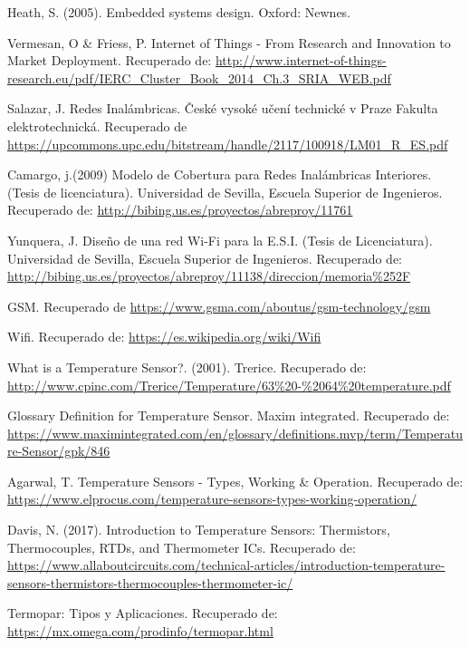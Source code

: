 \begin{thebibliography}{0}
	 Heath, S. (2005). Embedded systems design. Oxford: Newnes.
	
	 Vermesan, O \& Friess, P. Internet of Things - From Research and Innovation to Market Deployment. Recuperado de:  \url{http://www.internet-of-things-research.eu/pdf/IERC_Cluster_Book_2014_Ch.3_SRIA_WEB.pdf}
	
	 Salazar, J. Redes Inalámbricas. České vysoké učení technické v Praze Fakulta elektrotechnická. Recuperado de \url{https://upcommons.upc.edu/bitstream/handle/2117/100918/LM01_R_ES.pdf}
	
	 Camargo, j.(2009) Modelo de Cobertura para Redes Inalámbricas Interiores. (Tesis de licenciatura). Universidad de Sevilla, Escuela Superior de Ingenieros. Recuperado de: \url{http://bibing.us.es/proyectos/abreproy/11761}
	
	 Yunquera, J. Diseño de una red Wi-Fi para la E.S.I. (Tesis de Licenciatura). Universidad de Sevilla, Escuela Superior de Ingenieros. Recuperado de: \url{http://bibing.us.es/proyectos/abreproy/11138/direccion/memoria%252F}
	
	 GSM. Recuperado de \url{https://www.gsma.com/aboutus/gsm-technology/gsm}
	
	 Wifi. Recuperado de: \url{https://es.wikipedia.org/wiki/Wifi}
	
	
	 What is a Temperature Sensor?. (2001). Trerice. Recuperado de: \url{http://www.cpinc.com/Trerice/Temperature/63%20-%2064%20temperature.pdf}
	
	 Glossary Definition for Temperature Sensor. Maxim integrated. Recuperado de: \url{https://www.maximintegrated.com/en/glossary/definitions.mvp/term/Temperature-Sensor/gpk/846}
	
	 Agarwal, T.  Temperature Sensors - Types, Working \& Operation. Recuperado de: \url{https://www.elprocus.com/temperature-sensors-types-working-operation/}
	
	 Davis, N. (2017). Introduction to Temperature Sensors: Thermistors, Thermocouples, RTDs, and Thermometer ICs. Recuperado de: \url{https://www.allaboutcircuits.com/technical-articles/introduction-temperature-sensors-thermistors-thermocouples-thermometer-ic/}
	
	 Termopar: Tipos y Aplicaciones. Recuperado de: \url{ https://mx.omega.com/prodinfo/termopar.html}
	

\end{thebibliography}
